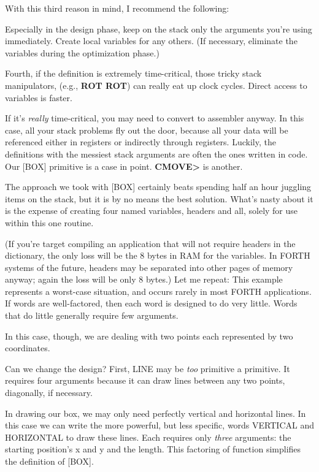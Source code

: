 With this third reason in mind, I recommend the following:

\begin{tip}
Especially in the design phase, keep on the stack only the arguments you're
using immediately. Create local variables for any others. (If necessary,
eliminate the variables during the optimization phase.)
\end{tip}
Fourth, if the definition is extremely time-critical, those tricky stack
manipulators, (e.g., \textbf{ROT ROT}) can really eat up clock cycles. Direct
access to variables is faster.

If it's \emph{really} time-critical, you may need to convert to assembler
anyway. In this case, all your stack problems fly out the door, because all
your data will be referenced either in registers or indirectly through
registers. Luckily, the definitions with the messiest stack arguments are
often the ones written in code. Our [BOX] primitive is a case in point.
\textbf{CMOVE>} is another.

The approach we took with [BOX] certainly beats spending half an
hour juggling items on the stack, but it is by no means the best solution.
What's nasty about it is the expense of creating four named variables,
headers and all, solely for use within this one routine.

(If you're target compiling an application that will not require
headers in the dictionary, the only loss will be the 8 bytes in RAM for the
variables. In FORTH systems of the future, headers may be separated
into other pages of memory anyway; again the loss will be only 8 bytes.)
Let me repeat: This example represents a worst-case situation, and
occurs rarely in most FORTH applications. If words are well-factored,
then each word is designed to do very little. Words that do little generally
require few arguments.

In this case, though, we are dealing with two points each represented
by two coordinates.

Can we change the design? First, LINE may be \emph{too} primitive a
primitive. It requires four arguments because it can draw lines between
any two points, diagonally, if necessary.

In drawing our box, we may only need perfectly vertical and horizontal
lines. In this case we can write the more powerful, but less specific,
words VERTICAL and HORIZONTAL to draw these lines. Each requires
only \emph{three} arguments: the starting position's x and y and the
length. This factoring of function simplifies the definition of [BOX].

